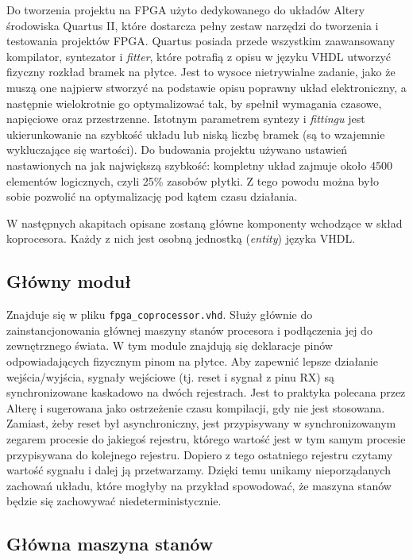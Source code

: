 Do tworzenia projektu na FPGA użyto dedykowanego do układów Altery środowiska Quartus II, które dostarcza pełny zestaw narzędzi do tworzenia i testowania projektów FPGA. Quartus posiada przede wszystkim zaawansowany kompilator, syntezator i \textit{fitter}, które potrafią z opisu w języku VHDL utworzyć fizyczny rozkład bramek na płytce. Jest to wysoce nietrywialne zadanie, jako że muszą one najpierw stworzyć na podstawie opisu poprawny układ elektroniczny, a następnie wielokrotnie go optymalizować tak, by spełnił wymagania czasowe, napięciowe oraz przestrzenne. Istotnym parametrem syntezy i \textit{fittingu} jest ukierunkowanie na szybkość układu lub niską liczbę bramek (są to wzajemnie wykluczające się wartości). Do budowania projektu używano ustawień nastawionych na jak największą szybkość: kompletny układ zajmuje około 4500 elementów logicznych, czyli 25\% zasobów płytki. Z tego powodu można było sobie pozwolić na optymalizację pod kątem czasu działania.

W następnych akapitach opisane zostaną główne komponenty wchodzące w skład koprocesora. Każdy z nich jest osobną jednostką (\textit{entity}) języka VHDL.


\subsection{Główny moduł}

Znajduje się w pliku \texttt{fpga\_coprocessor.vhd}. Służy głównie do zainstancjonowania głównej maszyny stanów procesora i podłączenia jej do zewnętrznego świata. W tym module znajdują się deklaracje pinów odpowiadających fizycznym pinom na płytce. Aby zapewnić lepsze działanie wejścia/wyjścia, sygnały wejściowe (tj. reset i sygnał z pinu RX) są synchronizowane kaskadowo na dwóch rejestrach. Jest to praktyka polecana przez Alterę i sugerowana jako ostrzeżenie czasu kompilacji, gdy nie jest stosowana. Zamiast, żeby reset był asynchroniczny, jest przypisywany w synchronizowanym zegarem procesie do jakiegoś rejestru, którego wartość jest w tym samym procesie przypisywana do kolejnego rejestru. Dopiero z tego ostatniego rejestru czytamy wartość sygnału i dalej ją przetwarzamy. Dzięki temu unikamy nieporządanych zachowań układu, które mogłyby na przykład spowodować, że maszyna stanów będzie się zachowywać niedeterministycznie.


\subsection{Główna maszyna stanów}

